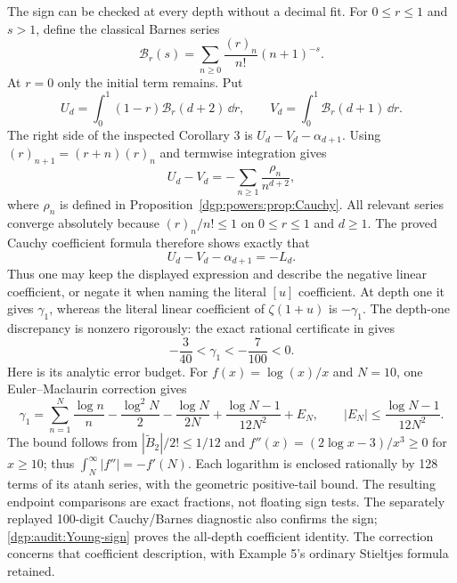 The sign can be checked at every depth without a decimal fit. For
$0\le r\le1$ and $s>1$, define the classical Barnes series
\[
 \mathcal B_r(s)=\sum_{n\ge0}\frac{(r)_n}{n!}(n+1)^{-s}.
\]
At $r=0$ only the initial term remains. Put
\[
 U_d=\int_0^1(1-r)\mathcal B_r(d+2)\,\dd r,
 \qquad V_d=\int_0^1\mathcal B_r(d+1)\,\dd r.
\]
The right side of the inspected Corollary 3 is $U_d-V_d-\alpha_{d+1}$.
Using $(r)_{n+1}=(r+n)(r)_n$ and termwise integration gives
\[
 U_d-V_d=-\sum_{n\ge1}\frac{\rho_n}{n^{d+2}},
\]
where $\rho_n$ is defined in Proposition~\ref{dgp:powers:prop:Cauchy}.
All relevant series converge absolutely because $(r)_n/n!\le1$ on
$0\le r\le1$ and $d\ge1$. The proved Cauchy coefficient formula therefore
shows exactly that
\begin{equation}\label{dgp:audit:Young-sign}
 U_d-V_d-\alpha_{d+1}=-L_d.
\end{equation}
Thus one may keep the displayed expression and describe the negative
linear coefficient, or negate it when naming the literal $[u]$ coefficient.
At depth one it gives $\gamma_1$, whereas the literal linear coefficient
of $\zeta(1+u)$ is $-\gamma_1$. The depth-one discrepancy is nonzero rigorously: the exact rational
certificate in 
gives
\[
 -\frac3{40}<\gamma_1<-\frac7{100}<0.
\]
Here is its analytic error budget. For $f(x)=\log(x)/x$ and $N=10$,
one Euler--Maclaurin correction gives
\[
 \gamma_1=\sum_{n=1}^{N}\frac{\log n}{n}
   -\frac{\log^2N}{2}-\frac{\log N}{2N}
   +\frac{\log N-1}{12N^2}+E_N,
 \qquad |E_N|\le\frac{\log N-1}{12N^2}.
\]
The bound follows from $|\widetilde B_2|/2!\le1/12$ and
$f''(x)=(2\log x-3)/x^3\ge0$ for $x\ge10$; thus
$\int_N^\infty|f''|=-f'(N)$. Each logarithm is enclosed rationally by
128 terms of its atanh series, with the geometric positive-tail bound.
The resulting endpoint comparisons are exact fractions, not floating
sign tests. The separately replayed 100-digit Cauchy/Barnes diagnostic
also confirms the sign; \eqref{dgp:audit:Young-sign} proves the
all-depth coefficient identity. The correction concerns that coefficient description,
with Example 5's ordinary Stieltjes formula retained.
